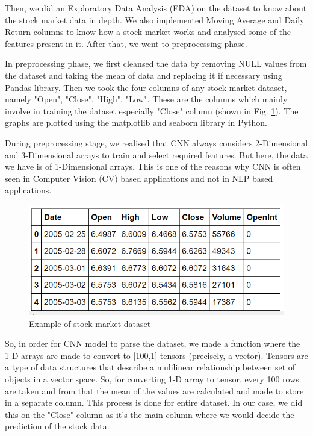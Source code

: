 \documentclass[conference]{IEEEtran}
\begin{document}
Then, we did an Exploratory Data Analysis (EDA) on the dataset to know about the stock market data in depth. We also implemented Moving Average and Daily Return columns to know how a stock market works and analysed some of the features present in it. After that, we went to preprocessing phase.

In preprocessing phase, we first cleansed the data by removing NULL values from the dataset and taking the mean of data and replacing it if necessary using Pandas library. Then we took the four columns of any stock market dataset, namely "Open", "Close", "High", "Low". These are the columns which mainly involve in training the dataset especially "Close" column (shown in Fig. \ref{dataset-1}). The graphs are plotted using the matplotlib and seaborn library in Python. 

During preprocessing stage, we realised that CNN always considers 2-Dimensional and 3-Dimensional arrays to train and select required features. But here, the data we have is of 1-Dimensional arrays. This is one of the reasons why CNN is often seen in Computer Vision (CV) based applications and not in NLP based applications. 

\begin{figure}[htbp]
\centerline{\includegraphics[scale=0.7]{Annotation-1.png}}
\caption{Example of stock market dataset}
\label{dataset-1}
\end{figure}

So, in order for CNN model to parse the dataset, we made a function where the 1-D arrays are made to convert to [100,1] tensors (precisely, a vector). Tensors are a type of data structures that describe a mulilinear relationship between set of objects in a vector space. So, for converting 1-D array to tensor, every 100 rows are taken and from that the mean of the values are calculated and made to store in a separate column. This process is done for entire dataset. In our case, we did this on the "Close" column as it's the main column where we would decide the prediction of the stock data.
\end{document}
